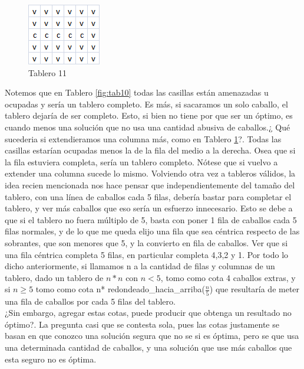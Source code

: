 \begin{figure}[htb]
  \begin{center}
      \includegraphics[scale=1]{imagenes/tab11.png}
  \end{center}
  \caption{Tablero 11}\label{fig:tab11}
\end{figure}

Notemos que en Tablero \ref{fig:tab10} todas las casillas están amenazadas u ocupadas y sería un tablero completo. Es más, si sacaramos un solo caballo, el tablero dejaría de ser completo. Esto, si bien no tiene por que ser un óptimo, es cuando menos una solución que no usa una cantidad abusiva de caballos.¿ Qué sucederia si extendieramos una columna más, como en Tablero \ref{fig:tab11}?. Todas las casillas estarían ocupadas menos la de la fila del medio a la derecha. Osea que si la fila estuviera completa, sería un tablero completo. Nótese que si vuelvo a extender una columna sucede lo mismo. Volviendo otra vez a tableros válidos, la idea recien mencionada nos hace pensar que independientemente del tamaño del tablero, con una línea de caballos cada 5 filas, debería bastar para completar el tablero, y ver más caballos que eso sería un esfuerzo innecesario. Esto se debe a que si el tablero no fuera múltiplo de 5, basta con poner 1 fila de caballos cada 5 filas normales, y de lo que me queda elijo una fila que sea céntrica respecto de las sobrantes, que son menores que 5, y la convierto en fila de caballos. Ver que si una fila céntrica completa 5 filas, en particular completa 4,3,2 y 1.
Por todo lo dicho anteriormente, si llamamos n a la cantidad de filas y columnas de un tablero, dado un tablero de $n*n$ con $n<5$, tomo como cota 4 caballos extras, y si $n\geq5$ tomo como cota n* redondeado_hacia_arriba($\frac{n}{5}$) que resultaría de meter una fila de caballos por cada 5 filas del tablero.\\
¿Sin embargo, agregar estas cotas, puede producir que obtenga un resultado no óptimo?. La pregunta casi que se contesta sola, pues las cotas justamente se basan en que conozco una solución segura que no se si es óptima, pero se que usa una determinada cantidad de caballos, y una solución que use más caballos que esta seguro no es óptima.

